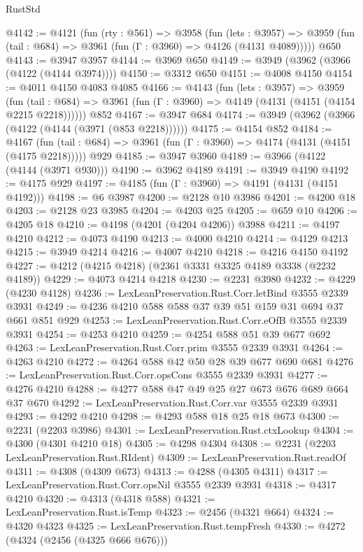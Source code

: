 \begin{lexlean}{RustStd}
\begin{coremodule}
@4142 := @4121
    (fun (rty : @561) =>
    @3958
      (fun (lets : @3957) =>
      @3959 (fun (tail : @684) => @3961 (fun (Γ : @3960) => @4126 (@4131 @4089)))))
    @650
@4143 := @3947 @3957
@4144 := @3969 @650
@4149 := @3949 (@3962 (@3966 (@4122 (@4144 @3974))))
@4150 := @3312 @650
@4151 := @4008 @4150
@4154 := @4011 @4150 @4083 @4085
@4166 := @4143
    (fun (lets : @3957) =>
    @3959
      (fun (tail : @684) => @3961 (fun (Γ : @3960) => @4149 (@4131 (@4151 (@4154 @2215 @2218))))))
    @852
@4167 := @3947 @684
@4174 := @3949 (@3962 (@3966 (@4122 (@4144 (@3971 (@853 @2218))))))
@4175 := @4154 @852
@4184 := @4167
    (fun (tail : @684) => @3961 (fun (Γ : @3960) => @4174 (@4131 (@4151 (@4175 @2218)))))
    @929
@4185 := @3947 @3960
@4189 := @3966 (@4122 (@4144 (@3971 @930)))
@4190 := @3962 @4189
@4191 := @3949 @4190
@4192 := @4175 @929
@4197 := @4185 (fun (Γ : @3960) => @4191 (@4131 (@4151 @4192)))
@4198 := @6 @3987
@4200 := @2128 @10 @3986
@4201 := @4200 @18
@4203 := @2128 @23 @3985
@4204 := @4203 @25
@4205 := @659 @10
@4206 := @4205 @18
@4210 := @4198 (@4201 (@4204 @4206)) @3988
@4211 := @4197 @4210
@4212 := @4073 @4190
@4213 := @4000 @4210
@4214 := @4129 @4213
@4215 := @3949 @4214
@4216 := @4007 @4210
@4218 := @4216 @4150 @4192
@4227 := @4212 (@4215 @4218) (@2361 @3331 @3325 @4189 @3338 (@2232 @4189))
@4229 := @4073 @4214 @4218
@4230 := @2231 @3980
@4232 := @4229 (@4230 @4128)
@4236 := LexLeanPreservation.Rust.Corr.letBind @3555 @2339 @3931
@4249 := @4236 @4210 @588 @588 @37 @39 @51 @159 @31 @694 @37 @661 @851 @929
@4253 := LexLeanPreservation.Rust.Corr.eOfB @3555 @2339 @3931
@4254 := @4253 @4210
@4259 := @4254 @588 @51 @39 @677 @692
@4263 := LexLeanPreservation.Rust.Corr.prim @3555 @2339 @3931
@4264 := @4263 @4210
@4272 := @4264 @588 @42 @50 @28 @39 @677 @690 @681
@4276 := LexLeanPreservation.Rust.Corr.opsCons @3555 @2339 @3931
@4277 := @4276 @4210
@4288 := @4277 @588 @47 @49 @25 @27 @673 @676 @689 @664 @37 @670
@4292 := LexLeanPreservation.Rust.Corr.var @3555 @2339 @3931
@4293 := @4292 @4210
@4298 := @4293 @588 @18 @25 @18 @673
@4300 := @2231 (@2203 @3986)
@4301 := LexLeanPreservation.Rust.ctxLookup
@4304 := @4300 (@4301 @4210 @18)
@4305 := @4298 @4304
@4308 := @2231 (@2203 LexLeanPreservation.Rust.RIdent)
@4309 := LexLeanPreservation.Rust.readOf
@4311 := @4308 (@4309 @673)
@4313 := @4288 (@4305 @4311)
@4317 := LexLeanPreservation.Rust.Corr.opsNil @3555 @2339 @3931
@4318 := @4317 @4210
@4320 := @4313 (@4318 @588)
@4321 := LexLeanPreservation.Rust.isTemp
@4323 := @2456 (@4321 @664)
@4324 := @4320 @4323
@4325 := LexLeanPreservation.Rust.tempFresh
@4330 := @4272 (@4324 (@2456 (@4325 @666 @676)))

\end{coremodule}
\end{lexlean}

